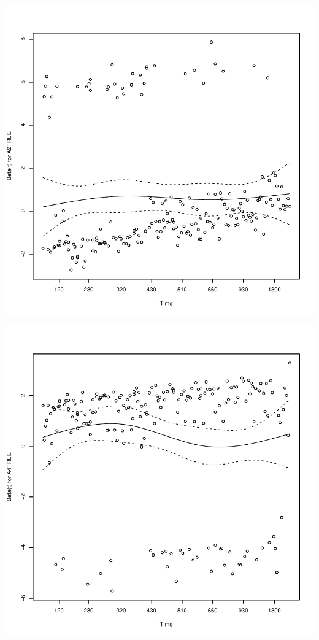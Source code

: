 \documentclass{article}\usepackage[]{graphicx}\usepackage[]{color}
\makeatletter
\def\maxwidth{ %
  \ifdim\Gin@nat@width>\linewidth
    \linewidth
  \else
    \Gin@nat@width
  \fi
}
\newenvironment{knitrout}{}{} %
\makeatother
\begin{document}
\begin{knitrout}
{\centering \includegraphics[width=\maxwidth]{figure/eda-ph-check-reduced-2} 

}




{\centering \includegraphics[width=\maxwidth]{figure/eda-ph-check-reduced-3} 

}



\end{knitrout}
\end{document}
